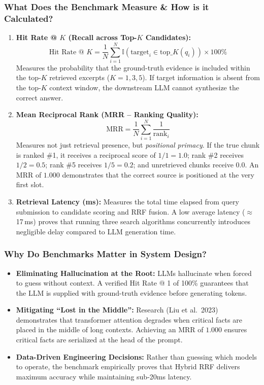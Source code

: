 \documentclass[11pt,a4paper]{article}
\begin{document}
\subsubsection{What Does the Benchmark Measure \& How is it Calculated?}
\begin{enumerate}[leftmargin=1.0cm]
\item \textbf{Hit Rate @ $K$ (Recall across Top-$K$ Candidates):}
\begin{equation}
\text{Hit Rate @ } K = \frac{1}{N} \sum_{i=1}^{N} \mathbb{I}(\text{target}_i \in \text{top\_}K(q_i)) \times 100\%
\end{equation}
Measures the probability that the ground-truth evidence is included within the top-$K$ retrieved excerpts ($K=1, 3, 5$). If target information is absent from the top-$K$ context window, the downstream LLM cannot synthesize the correct answer.
\item \textbf{Mean Reciprocal Rank (MRR -- Ranking Quality):}
\begin{equation}
\text{MRR} = \frac{1}{N} \sum_{i=1}^{N} \frac{1}{\text{rank}_i}
\end{equation}
Measures not just retrieval presence, but \emph{positional primacy}. If the true chunk is ranked \#1, it receives a reciprocal score of $1/1 = 1.0$; rank \#2 receives $1/2 = 0.5$; rank \#5 receives $1/5 = 0.2$; and unretrieved chunks receive $0.0$. An MRR of $1.000$ demonstrates that the correct source is positioned at the very first slot.
\item \textbf{Retrieval Latency (ms):} Measures the total time elapsed from query submission to candidate scoring and RRF fusion. A low average latency ($\approx$17\,ms) proves that running three search algorithms concurrently introduces negligible delay compared to LLM generation time.
\end{enumerate}

\subsubsection{Why Do Benchmarks Matter in System Design?}
\begin{itemize}[leftmargin=1.0cm]
\item \textbf{Eliminating Hallucination at the Root:} LLMs hallucinate when forced to guess without context. A verified Hit Rate @ 1 of 100\% guarantees that the LLM is supplied with ground-truth evidence before generating tokens.
\item \textbf{Mitigating ``Lost in the Middle'':} Research (Liu et al.\ 2023) demonstrates that transformer attention degrades when critical facts are placed in the middle of long contexts. Achieving an MRR of $1.000$ ensures critical facts are serialized at the head of the prompt.
\item \textbf{Data-Driven Engineering Decisions:} Rather than guessing which models to operate, the benchmark empirically proves that Hybrid RRF delivers maximum accuracy while maintaining sub-20ms latency.
\end{itemize}
\end{document}
